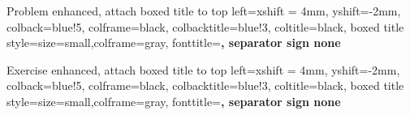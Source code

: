 \usepackage[10pt]{extsizes}
\usepackage{amsfonts}
\usepackage{amssymb}
\usepackage[shortlabels]{enumitem}
\usepackage{microtype} 
\usepackage{amsmath}
\usepackage{mathtools}
\usepackage{commath}
\usepackage{amsthm}
\usepackage{bbm}
\usepackage[colorlinks=true, allcolors=blue]{hyperref}

\usepackage{tcolorbox}
              {Problem}%
  {enhanced, %
  attach boxed title to top left={xshift = 4mm, yshift=-2mm},
  colback=blue!5, colframe=black, colbacktitle=blue!3, coltitle=black,
  boxed title style={size=small,colframe=gray},
  fonttitle=\bfseries,
  separator sign none
  }%
  {} 
\newenvironment{problem}[1]{\begin{prob*}{#1}{}}{\end{prob*}}

              {Exercise}%
  {enhanced, %
  attach boxed title to top left={xshift = 4mm, yshift=-2mm},
  colback=blue!5, colframe=black, colbacktitle=blue!3, coltitle=black,
  boxed title style={size=small,colframe=gray},
  fonttitle=\bfseries,
  separator sign none
  }%
  {} 
\newenvironment{exercise}[1]{\begin{exer*}{#1}{}}{\end{exer*}}

\newtheorem{thm}{Theorem}
\newtheorem*{thm-non}{Theorem}
\newtheorem{lemma}[thm]{Lemma}
\newtheorem{definition}[thm]{Definition}
\newtheorem{remark}[thm]{Remark}
\newtheorem{corollary}[thm]{Corollary}
\newtheorem{proposition}[thm]{Proposition}

\theoremstyle{remark}
\newtheorem*{example}{Example}

\renewcommand\thesection{\Alph{section}:}

